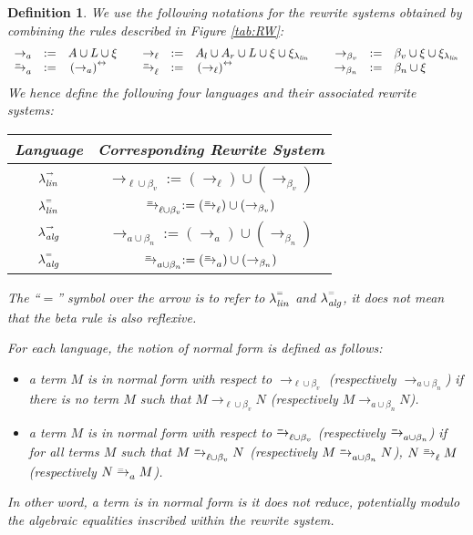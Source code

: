 \documentclass{LMCS}
\newtheorem{definition}[theorem]{Definition}
\newcommand{\lalin}{\ensuremath{\lambda_{{\it lin}}}}
\newcommand{\xllin}[1]{\ensuremath{\lambda^{\raisebox{0.5ex}{\textrm{\tiny $#1$}}}_{{\it lin}}}}
\newcommand{\xlalg}[1]{\ensuremath{\lambda^{\raisebox{0.5ex}{\textrm{\tiny $#1$}}}_{{\it alg}}}}
\newcommand{\llinred}{\xllin{\rightarrow}}
\newcommand{\lalgred}{\xlalg{\rightarrow}}
\newcommand{\llineq}{\xllin{=}}
\newcommand{\lalgeq}{\xlalg{=}}
\newcommand{\xto}[1]{\ensuremath{\rightarrow_{#1}}}
\newcommand{\simxto}[1]{\ensuremath{\rightarrow_{#1}^{\hspace{-2.2ex}\textrm{\tiny=}}}}
\newcommand{\tolinred}{\xto{\ell}}
\newcommand{\toalgred}{\xto{a}}
\newcommand{\tolineq}{\simxto{\ell}}
\newcommand{\toalgeq}{\simxto{a}}
\newcommand{\symclosure}[1]{\,{#1}^{\leftrightarrow}\,}
\newcommand{\tobv}{\xto{\beta_v}}
\newcommand{\tobn}{\xto{\beta_n}}
\newcommand{\toblinred}{\xto{\ell\cup\beta_v}}
\newcommand{\tobalgred}{\xto{a\cup\beta_n}}
\newcommand{\toblineq}{\simxto{{\ell}\cup\beta_v}}
\newcommand{\tobalgeq}{\simxto{a\cup\beta_n}}
\begin{document}
\begin{definition}\label{def:lang} We use the following notations for
  the rewrite systems obtained by combining the rules described in
  Figure \ref{tab:RW}:
  \[\begin{array}{rcl@{\hspace{0.75cm}}rcl@{\hspace{0.75cm}}rcl}
      \toalgred& := &A \cup L \cup \xi &\tolinred&:=&A_l \cup A_r \cup L \cup \xi \cup \xi_{\lalin} &\tobv&:=&\beta_v \cup \xi \cup \xi_{\lalin}\\
      \toalgeq&:=&\symclosure{(\toalgred)}&\tolineq&:=&\symclosure{(\tolinred)}&\tobn&:=&\beta_n \cup \xi
  \end{array}\]
We hence define the following four languages and their associated
  rewrite systems:

  \medskip
  \begin{center}
    \begin{tabular}{|c|c|}\hline
      Language & Corresponding Rewrite System\\
      \hline
      $\llinred$ & $\toblinred:=(\tolinred)\cup(\tobv)$\\
      $\llineq$ & $\toblineq:=(\tolineq)\cup(\tobv)$\\
      $\lalgred$ & $\tobalgred := (\toalgred)\cup(\tobn)$\\
      $\lalgeq$ &$\tobalgeq:=(\toalgeq)\cup(\tobn)$\\\hline
    \end{tabular}
  \end{center}
The ``$=$'' symbol over the arrow is to refer to $\llineq$ and $\lalgeq$, it does not mean that the beta rule is also reflexive.

  \medskip\noindent For each language, the notion of {\em normal form}
  is defined as follows: 
  \begin{itemize}
    \item a term $M$ is in {\em normal form with respect to $\toblinred$}
      (respectively $\tobalgred$) if there is no term $M$ such that
      $M\toblinred N$ (respectively $M\tobalgred N$).
    \item a term $M$ is in {\em normal form with respect to $\toblineq$}
      (respectively $\tobalgeq$) if for all terms $M$ such that
      $M\toblineq N$ (respectively $M\tobalgeq N$), $N\tolineq M$ (respectively $N\toalgeq M$).
  \end{itemize}
  In other word, a term is in normal form is it does not reduce,
  potentially modulo the algebraic equalities inscribed within the
  rewrite system.
\end{definition}
\end{document}
